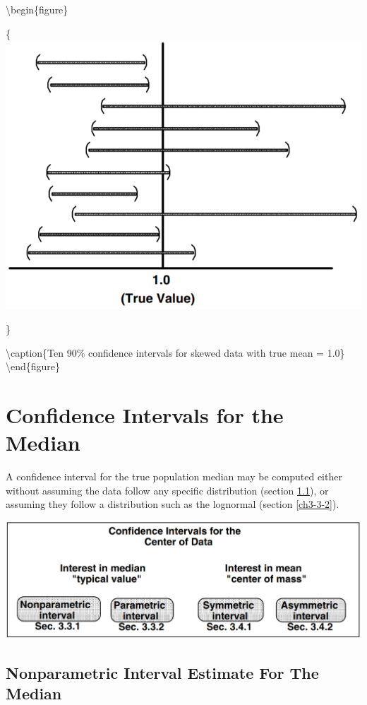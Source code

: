 \documentclass[]{book}
\begin{document}
\textbackslash{}begin\{figure\}

\{\centering \includegraphics[width=9.61in]{figures/3_3}

\}

\textbackslash{}caption\{Ten 90\% confidence intervals for skewed data with true mean = 1.0\}\label{fig:fig-3-3}
\textbackslash{}end\{figure\}

\hypertarget{ch3-3}{%
\section{Confidence Intervals for the Median}\label{ch3-3}}

A confidence interval for the true population median may be computed either without assuming the data follow any specific distribution (section \ref{ch3-3-1}), or assuming they follow a distribution such as the lognormal (section \ref{ch3-3-2}).

\begin{center}\includegraphics[width=15.58in]{figures/3_B} \end{center}

\hypertarget{ch3-3-1}{%
\subsection{Nonparametric Interval Estimate For The Median}\label{ch3-3-1}}
\end{document}
